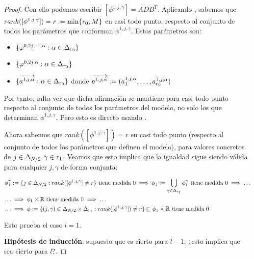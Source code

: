 \begin{proof}
    Con ello podemos escribir $[\phi^{1, j, \gamma}] = A D B^T$. Aplicando , sabemos que $rank([\phi^{1, j, \gamma}]) = r := \min \{ r_0, M \}$ en casi todo punto, respecto al conjunto de todos los parámetros que conforman $\phi^{1, j, \gamma}$. Estos parámetros son:

    \begin{itemize}
        \item $\{ \varphi^{0, 2j - 1, \alpha}: \alpha \in \Delta_{r_0} \}$
        \item $\{ \varphi^{0, 2j, \alpha}: \alpha \in \Delta_{r_0} \}$
        \item $\{ \overrightarrow{a^{1, j, \alpha}} : \alpha \in \Delta_{r_0} \}$ donde $\overrightarrow{a^{1, j, \alpha}} := (a^{1, j, \alpha}_1, \ldots,  a^{1, j, \alpha}_{r_0})$
    \end{itemize}

    Por tanto, falta ver que dicha afirmación se mantiene para casi todo punto respecto al conjunto de todos los parámetros del modelo, no solo los que determinan $\phi^{1, j, \gamma}$. Pero esto es directo usando .

    Ahora sabemos que $rank([\phi^{1, j, \gamma}]) = r$ en casi todo punto (respecto al conjunto de todos los parámetros que definen el modelo), para valores concretos de $j \in \Delta_{N/2}, \gamma \in r_1$. Veamos que esto implica que la igualdad sigue siendo válida para cualquier $j, \gamma$ de forma conjunta:

    \begin{equation}
    \begin{split}
        \phi_1^\gamma &:= \{ j \in \Delta_{N/2}: rank([\phi^{1, j, \gamma}] \neq r \} \text{ tiene medida } 0 \implies \phi_1 := \bigcup_{\gamma \in \Delta_{r_1}} \phi_1^\gamma \text{ tiene medida } 0 \implies \ldots \\
        \ldots &\implies \phi_1 \times \mathbb{R} \text{ tiene medida } 0 \implies \ldots \\
        \ldots &\implies \phi := \{ (j, \gamma) \in \Delta_{N/2} \times \Delta_{r_1}: rank([\phi^{1, j, \gamma}]) \neq r \} \subseteq \phi_1 \times \mathbb{R} \text{ tiene medida } 0
    \end{split}
    \end{equation}

    Esto prueba el caso $l = 1$.

    \textbf{Hipótesis de inducción}: supuesto que es cierto para $l - 1$, ¿esto implica que sea cierto para $l$?.


\end{proof}
